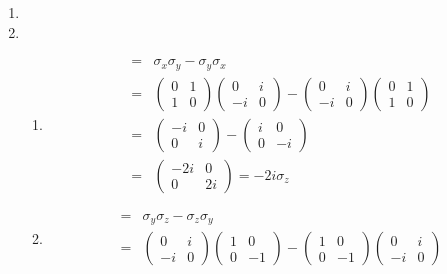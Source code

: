 \documentclass[letter,twoside,12pt]{article}
\begin{document}
\begin{enumerate}
\item

\item \begin{enumerate}

\item \begin{eqnarray} [\sigma_x, \sigma_y ] &=& \sigma_x\sigma_y - \sigma_y\sigma_x \nonumber
\\ &=& \begin{pmatrix} 0 & 1 \\ 1 & 0 \end{pmatrix}\begin{pmatrix} 0 & i \\ -i & 0 \end{pmatrix}-\begin{pmatrix} 0 & i \\ -i & 0 \end{pmatrix}\begin{pmatrix} 0 & 1 \\ 1 & 0 \end{pmatrix} \nonumber
\\ &=& \begin{pmatrix} -i & 0 \\ 0 & i \end{pmatrix}-\begin{pmatrix} i & 0 \\ 0 & -i \end{pmatrix} \nonumber
\\ &=& \begin{pmatrix} -2i & 0 \\ 0 & 2i \end{pmatrix}= -2i\sigma_z\nonumber
\end{eqnarray}
\item \begin{eqnarray} [\sigma_y, \sigma_z ] &=& \sigma_y\sigma_z - \sigma_z\sigma_y \nonumber
\\ &=& \begin{pmatrix} 0 & i \\ -i & 0 \end{pmatrix}\begin{pmatrix} 1 & 0 \\ 0 & -1 \end{pmatrix}-\begin{pmatrix} 1 & 0 \\ 0 & -1 \end{pmatrix}\begin{pmatrix} 0 & i \\ -i & 0 \end{pmatrix} \nonumber

\end{eqnarray}
\end{enumerate}
\end{enumerate}
\end{document}
